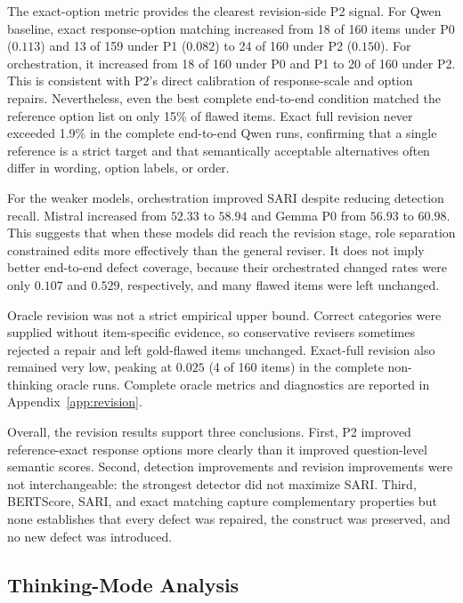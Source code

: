\documentclass[11pt,a4paper]{article}
\begin{document}
The exact-option metric provides the clearest revision-side P2 signal. For Qwen
baseline, exact response-option matching increased from 18 of 160 items under P0
($0.113$) and 13 of 159 under P1 ($0.082$) to 24 of 160 under P2 ($0.150$).
For orchestration, it increased from 18 of 160 under P0 and P1 to 20 of 160
under P2. This is consistent with P2's direct calibration of response-scale and
option repairs. Nevertheless, even the best complete end-to-end condition
matched the reference option list on only 15\% of flawed items. Exact full
revision never exceeded 1.9\% in the complete end-to-end Qwen runs, confirming
that a single reference is a strict target and that semantically acceptable
alternatives often differ in wording, option labels, or order.

For the weaker models, orchestration improved SARI despite reducing detection
recall. Mistral increased from $52.33$ to $58.94$ and Gemma P0 from $56.93$ to
$60.98$. This suggests that when these models did reach the revision stage,
role separation constrained edits more effectively than the general reviser.
It does not imply better end-to-end defect coverage, because their orchestrated
changed rates were only $0.107$ and $0.529$, respectively, and many flawed items
were left unchanged.

Oracle revision was not a strict empirical upper bound. Correct categories
were supplied without item-specific evidence, so conservative revisers
sometimes rejected a repair and left gold-flawed items unchanged. Exact-full
revision also remained very low, peaking at $0.025$ (4 of 160 items) in the
complete non-thinking oracle runs. Complete oracle metrics and diagnostics are
reported in Appendix~\ref{app:revision}.

Overall, the revision results support three conclusions. First, P2 improved
reference-exact response options more clearly than it improved question-level
semantic scores. Second, detection improvements and revision improvements were
not interchangeable: the strongest detector did not maximize SARI. Third,
BERTScore, SARI, and exact matching capture complementary properties but none
establishes that every defect was repaired, the construct was preserved, and no
new defect was introduced.


\subsection{Thinking-Mode Analysis}
\label{subsec:thinking-results}
\end{document}
